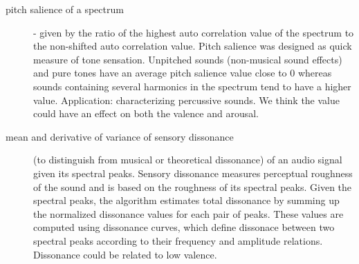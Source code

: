 \begin{description}
\item[pitch salience of a spectrum] - given by the ratio of the highest auto correlation value of the spectrum to the non-shifted auto correlation value. Pitch salience was designed as quick measure of tone sensation. Unpitched sounds (non-musical sound effects) and pure tones have an average pitch salience value close to 0 whereas sounds containing several harmonics in the spectrum tend to have a higher value. Application: characterizing percussive sounds. We think the value could have an effect on both the valence and arousal.

\item[mean and derivative of variance of sensory dissonance] (to distinguish from musical or theoretical dissonance) of an audio signal given its spectral peaks. Sensory dissonance measures perceptual roughness of the sound and is based on the roughness of its spectral peaks. Given the spectral peaks, the algorithm estimates total dissonance by summing up the normalized dissonance values for each pair of peaks. These values are computed using dissonance curves, which define dissonace between two spectral peaks according to their frequency and amplitude relations. Dissonance could be related to low valence.

\end{description}

